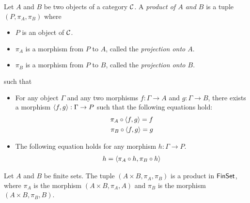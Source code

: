 \begin{definition}[Product] \label{def:product}
  Let \(A\) and \(B\) be two objects of a category \(\mathcal C\).
  A \emph{product of \(A\) and \(B\)}
  is a tuple \((P,\pi_A,\pi_B)\)
  where
  \begin{itemize}
  \item \(P\) is an object of \(\mathcal C\).
  \item \(\pi_A\) is a morphism from \(P\) to \(A\),
    called the \emph{projection onto \(A\)}.
  \item \(\pi_B\) is a morphism from \(P\) to \(B\),
    called the \emph{projection onto \(B\)}.
  \end{itemize}
  such that
  \begin{itemize}
  \item For any object \(\Gamma\) and any two morphisms \(f : \Gamma \to A\)
    and \(g : \Gamma \to B\),
    there exists a morphism \(\langle f,g\rangle : \Gamma \to P\)
    such that the following equations hold:
    \begin{align}
      \pi_A \circ \langle f,g\rangle = f \\
      \pi_B \circ \langle f,g\rangle = g
    \end{align}
  \item The following equation holds for any morphism \(h : \Gamma \to P\).
    \begin{align}
      h = \langle \pi_A \circ h, \pi_B \circ h\rangle
    \end{align}
  \end{itemize}
\end{definition}

\begin{proposition}
  Let \(A\) and \(B\) be finite sets.
  The tuple \((A \times B, \pi_A, \pi_B)\)
  is a product in \(\mathsf{FinSet}\),
  where \(\pi_A\) is the morphism \((A\times B,\pi_A, A)\)
  and \(\pi_B\) is the morphism \((A \times B,\pi_B,B)\).
\end{proposition}

